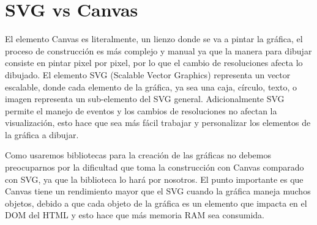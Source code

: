 \section[SVG vs Canvas]{SVG vs Canvas \cite{OperaSVGCanvas}}
El elemento Canvas es literalmente, un lienzo donde se va a pintar la gráfica, el proceso de construcción es más complejo y manual ya que la manera para dibujar consiste en pintar pixel por pixel, por lo que el cambio de resoluciones afecta lo dibujado. El elemento SVG (Scalable Vector Graphics) representa un vector escalable, donde cada elemento de la gráfica, ya sea una caja, círculo, texto, o imagen representa un sub-elemento del SVG general. Adicionalmente SVG permite el manejo de eventos y los cambios de resoluciones no afectan la visualización, esto hace que sea más fácil trabajar y personalizar los elementos de la gráfica a dibujar.

Como usaremos bibliotecas para la creación de las gráficas no debemos preocuparnos por la dificultad que toma la construcción con Canvas comparado con SVG, ya que la biblioteca lo hará por nosotros. El punto importante es que Canvas tiene un rendimiento mayor que el SVG cuando la gráfica maneja muchos objetos, debido a que cada objeto de la gráfica es un elemento que impacta en el DOM \cite{W3DOM} del HTML y esto hace que más memoria RAM sea consumida.
\\[20pt]
